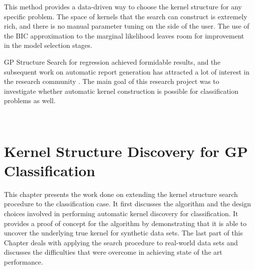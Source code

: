 \documentclass[a4paper,12pt ]{report}
\renewcommand{\GP}{{GP}}
\begin{document}
This method provides a data-driven way to choose the kernel structure for any specific problem. The space of kernels that the search can construct is extremely rich, and there is no manual parameter tuning on the side of the user. The use of the BIC approximation to the marginal likelihood leaves room for improvement in the model selection stages.


{\GP} Structure Search for regression achieved formidable results, and the subsequent work on automatic report generation has attracted a lot of interest in the research community \cite{lloyd14}. The main goal of this research project was to investigate whether automatic kernel construction is possible for classification problems as well.



\clearpage

~~~~~~ %

\clearpage


\chapter{Kernel Structure Discovery for GP Classification}

This chapter presents the work done on extending the kernel structure search procedure to the classification case. It first discusses the algorithm and the design choices involved in performing automatic kernel discovery for classification. It provides a proof of concept for the algorithm by demonstrating that it is able to uncover the underlying true kernel for synthetic data sets. The last part of this Chapter deals with applying the search procedure to real-world data sets and discusses the difficulties that were overcome in achieving state of the art performance.
\end{document}
